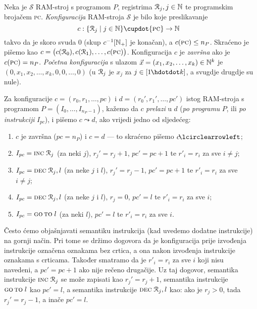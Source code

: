 \begin{definicija}[{name=[RAM-konfiguracije i prijelazi među njima]}]\label{def:RAMconf}
Neka je $\mathcal S$ RAM-stroj s programom $P$, registrima $\mathcal R_{j},j\in{\mathbb N}$ te programskim brojačem \textsc{pc}. \emph{Konfiguracija} RAM-stroja $\mathcal S$ je bilo koje preslikavanje
\begin{equation}
    c:\{\reg{j}\mid j\in\N\}\dcup\{\textsc{pc}\}\to\N
\end{equation} takvo da je skoro svuda $0$ (skup $c^{-1}[{\mathbb N}_+]$ je konačan), a $c(\textsc{pc})\le n_P$. Skraćeno je pišemo kao $c=\bigl(c(\mathcal R_{0}),c(\mathcal R_{1}),\dotsc,c(\textsc{pc})\bigr)$. Konfiguracija $c$ je \emph{završna} ako je $c(\textsc{pc})=n_P$. \emph{Početna konfiguracija} s ulazom $\vec x=(x_1,x_2,\dotsc,x_k)\in{\mathbb N}^k$ je $(0,x_1,x_2,\dotsc,x_k,0,0,\dotsc,0)$ (u $\mathcal R_{j}$ je $x_j$ za $j\in[1\mspace{-1mu}\dd k]$, a svugdje drugdje su nule).

    Za konfiguracije $c=(r_0,r_1,\dotsc,pc)$ i $d=(r_0',r_1',\dotsc,pc')$ istog RAM-stroja s programom $P=(I_0,\dotsc,I_{n_P-1})$, kažemo da $c$ \emph{prelazi} u $d$ (\emph{po programu} $P$, ili \emph{po instrukciji} $I_{pc}$), i pišemo $c\leadsto d$, ako vrijedi jedno od sljedećeg:
\begin{enumerate}
    \item\label{stav:leadzav}
    $c$ je završna ($pc=n_P$) i $c=d$ --- to skraćeno pišemo $c\!\lcirclearrowleft$\!;
    \item\label{stav:leadINC}
    $I_{pc}=\textsc{inc}\;\mathcal R_{j}$ (za neki $j$), $r_j'=r_j+1$, $pc'=pc+1$ te $r'_i=r_i$ za sve $i\ne j$;
    \item\label{stav:leadDEC-}
    $I_{pc}=\textsc{dec}\;\mathcal R_{j},l$ (za neke $j$ i $l$),  $r_j'=r_j-1$, $pc'=pc+1$ te $r'_i=r_i$ za sve $i\ne j$;
    \item\label{stav:leadDEC0}
    $I_{pc}=\textsc{dec}\;\mathcal R_{j},l$ (za neke $j$ i $l$), $r_j=0$, $pc'=l$ te $r'_i=r_i$ za sve $i$;
    \item\label{stav:leadGOTO}
    $I_{pc}=\textsc{go\,to}\;l$ (za neki $l$), $pc'=l$ te $r'_i=r_i$ za sve $i$.\qedhere
\end{enumerate}
\end{definicija}

Često ćemo objašnjavati semantiku instrukcija (kad uvedemo dodatne instrukcije) na gornji način. Pri tome se držimo dogovora da je konfiguracija prije izvođenja instrukcije označena oznakama bez crtica, a ona nakon izvođenja instrukcije oznakama s crticama. Također smatramo da je $r'_i=r_i$ za sve $i$ koji nisu navedeni, a $pc'=pc+1$ ako nije rečeno drugačije. Uz taj dogovor, semantika instrukcije $\textsc{inc}\;\mathcal R_{j}$ se može zapisati kao $r_j'=r_j+1$, semantika instrukcije $\textsc{go\,to}\;l$ kao $pc'=l$, a semantika instrukcije $\textsc{dec}\;\mathcal R_{j},l$ kao: ako je $r_j>0$, tada $r_j'=r_j-1$, a inače $pc'=l$.

